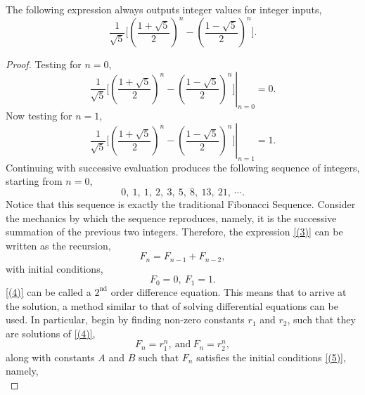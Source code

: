 \documentclass{article}
\begin{document}
\begin{theorem}
    The following expression always outputs integer values for integer inputs,
    \begin{equation} \label{(3)}
        \frac{1}{\sqrt{5}} \Bigg[\left(\frac{1+\sqrt{5}}{2}\right)^{\!\!n}-\left(\frac{1-\sqrt{5}}{2}\right)^{\!\!n}\Bigg].
    \end{equation}
\end{theorem}
\begin{proof}
    Testing for $n=0$,
    \begin{equation*}
        \left. \frac{1}{\sqrt{5}} \Bigg[\left(\frac{1+\sqrt{5}}{2}\right)^{\!\!n}-\left(\frac{1-\sqrt{5}}{2}\right)^{\!\!n}\Bigg] \right\rvert_{n=0} = 0.
    \end{equation*}
    Now testing for $n=1$,
    \begin{equation*}
        \left. \frac{1}{\sqrt{5}} \Bigg[\left(\frac{1+\sqrt{5}}{2}\right)^{\!\!n}-\left(\frac{1-\sqrt{5}}{2}\right)^{\!\!n}\Bigg] \right\rvert_{n=1} = 1.
    \end{equation*}
    Continuing with successive evaluation produces the following sequence of integers, starting from $n=0$,
    \begin{equation*}
        0,\ 1,\ 1,\ 2,\ 3,\ 5,\ 8,\ 13,\ 21,\ \cdots.
    \end{equation*}
    Notice that this sequence is exactly the traditional Fibonacci Sequence. Consider the mechanics by which the sequence reproduces, namely, it is the successive summation of the previous two integers. Therefore, the expression \eqref{(3)} can be written as the recursion,
    \begin{equation} \label{(4)}
        F_n = F_{n-1} + F_{n-2},
    \end{equation}
    with initial conditions,
    \begin{equation} \label{(5)}
        F_0 = 0,\ F_1 = 1.
    \end{equation}
    \eqref{(4)} can be called a $2^\text{nd}$ order difference equation. This means that to arrive at the solution, a method similar to that of solving differential equations can be used. In particular, begin by finding non-zero constants $r_1$ and $r_2$, such that they are solutions of \eqref{(4)},
    \begin{equation} \label{(6)}
        F_n = r_1^n,\ \text{and}\ F_n = r_2^n,
    \end{equation}
    along with constants $A$ and $B$ such that $F_n$ satisfies the initial conditions \eqref{(5)}, namely,
    \begin{equation} \label{(7)}

\end{equation}
\end{proof}
\end{document}
